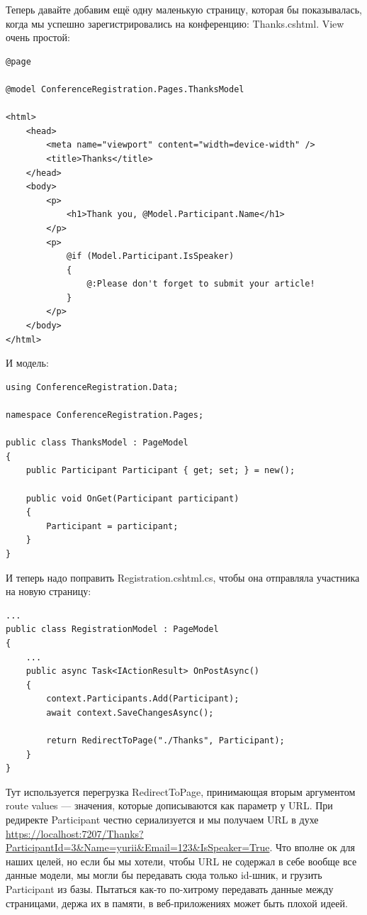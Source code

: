 \documentclass[a5paper]{article}
\begin{document}
Теперь давайте добавим ещё одну маленькую страницу, которая бы показывалась, когда мы успешно зарегистрировались на конференцию: Thanks.cshtml. View очень простой:

\begin{verbatim}
@page

@model ConferenceRegistration.Pages.ThanksModel

<html>
    <head>
        <meta name="viewport" content="width=device-width" />
        <title>Thanks</title>
    </head>
    <body>
        <p>
            <h1>Thank you, @Model.Participant.Name</h1>
        </p>
        <p>
            @if (Model.Participant.IsSpeaker)
            {
                @:Please don't forget to submit your article!
            }
        </p>
    </body>
</html>
\end{verbatim}

И модель: 

\begin{verbatim}
using ConferenceRegistration.Data;

namespace ConferenceRegistration.Pages;

public class ThanksModel : PageModel
{
    public Participant Participant { get; set; } = new();

    public void OnGet(Participant participant)
    {
        Participant = participant;
    }
}
\end{verbatim}

И теперь надо поправить Registration.cshtml.cs, чтобы она отправляла участника на новую страницу:

\begin{verbatim}
...
public class RegistrationModel : PageModel
{
    ...
    public async Task<IActionResult> OnPostAsync()
    {
        context.Participants.Add(Participant);
        await context.SaveChangesAsync();

        return RedirectToPage("./Thanks", Participant);
    }
}
\end{verbatim}

Тут используется перегрузка RedirectToPage, принимающая вторым аргументом route values --- значения, которые дописываются как параметр у URL. При редиректе Participant честно сериализуется и мы получаем URL в духе \url{https://localhost:7207/Thanks?ParticipantId=3&Name=yurii&Email=123&IsSpeaker=True}. Что вполне ок для наших целей, но если бы мы хотели, чтобы URL не содержал в себе вообще все данные модели, мы могли бы передавать сюда только id-шник, и грузить Participant из базы. Пытаться как-то по-хитрому передавать данные между страницами, держа их в памяти, в веб-приложениях может быть плохой идеей.
\end{document}
